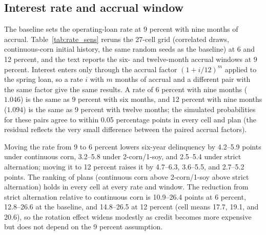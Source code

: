 \documentclass[11pt,letterpaper]{article}
\theoremstyle{remark}
\begin{document}
\subsection{\label{subsec:rate_sens}Interest rate and accrual window}
The baseline sets the operating-loan rate at 9 percent with nine months of accrual. Table~\ref{tab:rate_sens} reruns the 27-cell grid (correlated draws, continuous-corn initial history, the same random seeds as the baseline) at 6 and 12 percent, and the text reports the six- and twelve-month accrual windows at 9 percent. Interest enters only through the accrual factor $(1+i/12)^{m}$ applied to the spring loan, so a rate $i$ with $m$ months of accrual and a different pair with the same factor give the same results. A rate of 6 percent with nine months ($1.046$) is the same as 9 percent with six months, and 12 percent with nine months ($1.094$) is the same as 9 percent with twelve months; the simulated probabilities for these pairs agree to within 0.05 percentage points in every cell and plan (the residual reflects the very small difference between the paired accrual factors).

Moving the rate from 9 to 6 percent lowers six-year delinquency by 4.2--5.9 points under continuous corn, 3.2--5.8 under 2-corn/1-soy, and 2.5--5.4 under strict alternation; moving it to 12 percent raises it by 4.7--6.3, 3.6--5.5, and 2.7--5.2 points. The ranking of plans (continuous corn above 2-corn/1-soy above strict alternation) holds in every cell at every rate and window. The reduction from strict alternation relative to continuous corn is 10.9--26.4 points at 6 percent, 12.8--26.6 at the baseline, and 14.8--26.5 at 12 percent (cell means 17.7, 19.1, and 20.6), so the rotation effect widens modestly as credit becomes more expensive but does not depend on the 9 percent assumption.
\end{document}
